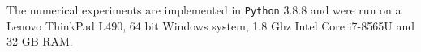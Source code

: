 The numerical experiments are implemented in \lstinline!Python! 3.8.8 and were run on a Lenovo ThinkPad L490, 64 bit Windows system, 1.8 Ghz Intel Core i7-8565U and 32 GB RAM.



